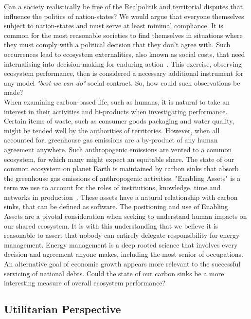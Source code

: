 \documentclass[12pt, oneside]{article}   	%
\begin{document}
Can a society realistically be free of the Realpolitik and territorial disputes that influence the politics of nation-states?
We would argue that everyone themselves subject to nation-states and must serve at least minimal compliance.
It is common for the most reasonable societies to find themselves in situations where they must comply with a political decision that they don't agree with.
Such occurrences lead to ecosystem externalities, also known as social costs, that need internalising into decision-making for enduring action~\cite{rc1}.
This exercise, observing ecosystem performance, then is considered a necessary additional instrument for any model \emph{"best we can do"} social contract.
So, how could such observations be made?\\

When examining carbon-based life, such as humans, it is natural to take an interest in their activities and bi-products when investigating performance.
Certain items of waste, such as consumer goods packaging and water quality, might be tended well by the authorities of territories.
However, when all accounted for, greenhouse gas emissions are a by-product of any human agreement anywhere.
Such anthropogenic emissions are vented to a common ecosystem, for which many might expect an equitable share.
The state of our common ecosystem on planet Earth is maintained by carbon sinks that absorb the greenhouse gas emissions of anthropogenic activities.
"Enabling Assets" is a term we use to account for the roles of institutions, knowledge, time and networks in production~\cite{pd3}.
These assets have a natural relationship with carbon sinks, that can be defined as software.
The positioning and use of Enabling Assets are a pivotal consideration when seeking to understand human impacts on our shared ecosystem.
It is with this understanding that we believe it is reasonable to assert that nobody can entirely delegate responsibility for energy management.
Energy management is a deep rooted science that involves every decision and agreement anyone makes, including the most senior of occupations.
An alternative goal of economic growth appears more relevant to the successful servicing of national debts.
Could the state of our carbon sinks be a more interesting measure of overall ecosystem performance?\\

\subsection{Utilitarian Perspective}
\end{document}
